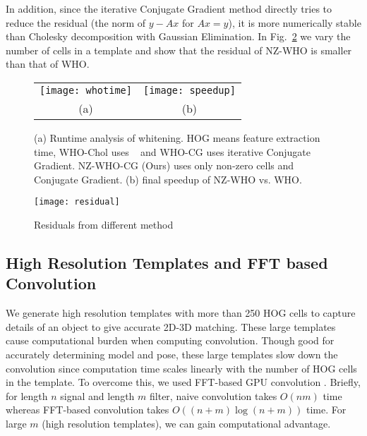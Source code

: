 In addition, since the iterative Conjugate Gradient method directly
tries to reduce the residual (the norm of $y-Ax$ for $Ax = y$), it is
more numerically stable than Cholesky decomposition with Gaussian
Elimination. In Fig.~\ref{fig:whoresidual} we vary the number of cells in a template and show that
the residual of NZ-WHO is smaller than that of WHO.

\begin{figure}[t]
  \begin{center}
  \begin{tabular}{cc}
     \texttt{[image: whotime]} & 
     \texttt{[image: speedup]}\\
     (a) & (b) \\
 \end{tabular}
  \end{center}
  \caption{(a) Runtime analysis of whitening. HOG means feature
    extraction time, WHO-Chol uses ~\cite{Hariharan12} and
    WHO-CG uses iterative Conjugate Gradient. NZ-WHO-CG (Ours) uses only
    non-zero cells and Conjugate Gradient. (b) final speedup
    of NZ-WHO vs. WHO.}
  \label{fig:whotime}
\end{figure}
%
\begin{figure}[t]
  \centering
  \texttt{[image: residual]}
  \caption{Residuals from different method}
  \label{fig:whoresidual}
\end{figure}


\subsection{High Resolution Templates and FFT based Convolution}
\label{sec:fft} 

We generate high resolution templates with more than 250 HOG cells to capture
details of an object to give accurate 2D-3D matching. These large templates
cause computational burden when computing convolution. Though good for
accurately determining model and pose, these large templates slow down the
convolution since computation time scales linearly with the number of HOG cells
in the template. To overcome this, we used FFT-based GPU convolution
\cite{Podlozhnyuk}. Briefly, for length $n$ 
signal and length $m$ filter, naive convolution takes $O(nm)$ time whereas
FFT-based convolution takes $O\left( (n + m)\log (n+m) \right)$ time. For large
$m$ (high resolution templates), we can gain computational advantage.
